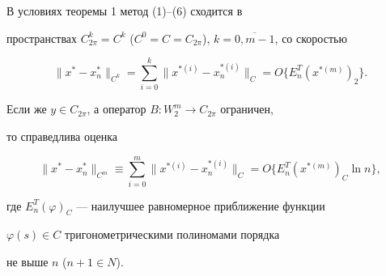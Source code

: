 







\begin{cor}


В условиях теоремы 1 метод (1)--(6) сходится в


пространствах $C_{2 \pi}^k=C^k$ ($C^0=C=C_{2 \pi}$), $k=\overline


{0,m-1}$, со скоростью


\begin{equation}


\| x^* - x_n^* \|_{C^k}=\sum_{i=0}^k \| x^{*(i)} - x_n^{*(i)}


\|_{C}=O \lbrace E_n^T(x^{*(m)})_{2} \rbrace.


\end{equation}


Если же $y \in C_{2 \pi}$, а оператор $B:W_2^m \to C_{2 \pi}$ ограничен,


то справедлива оценка


\begin{equation}


\| x^* - x_n^* \|_{C^m} \equiv \sum_{i=0}^m \| x^{*{(i)}} -


x_n^{*(i)} \|_{C}=O \lbrace E_n^T(x^{*(m)})_{C} \ln n \rbrace,


\end{equation}


где $E_n^T( \varphi)_{C}$ --- наилучшее равномерное приближение функции


$ \varphi(s) \in C $ тригонометрическими полиномами порядка


не выше $n$ ($n+1 \in N$).


\end{cor}








